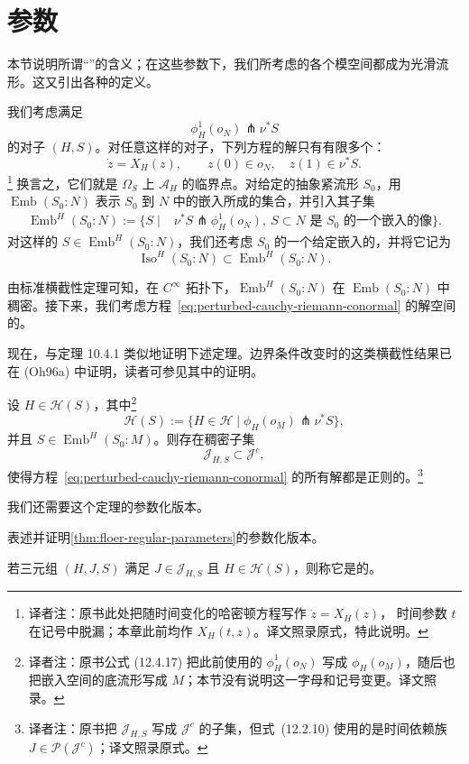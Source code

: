 \section{\termFloerRegular{}参数}
\label{sec:floer-regular-parameters}

本节说明所谓“\termGenericParameter{}”的含义；在这些参数下，我们所考虑的各个模空间都成为光滑流形。这又引出各种\termFloerOperator{}的定义。

我们考虑满足
\[
  \phi_H^1(o_N)\pitchfork\nu^*S
\]
的对子 $(H,S)$。对任意这样的对子，下列方程的解只有有限多个：
\[
  \dot z=X_H(z),
  \qquad z(0)\in o_N,
  \quad z(1)\in\nu^*S.
\]
\footnote{译者注：原书此处把随时间变化的哈密顿方程写作 $\dot z=X_H(z)$，
时间参数 $t$ 在记号中脱漏；本章此前均作 $X_H(t,z)$。译文照录原式，特此说明。}
换言之，它们就是 $\Omega_S$ 上 $\mathcal A_H$ 的临界点。对给定的抽象紧流形 $S_0$，用 $\operatorname{Emb}(S_0:N)$ 表示 $S_0$ 到 $N$ 中的嵌入所成的集合，并引入其子集
\begin{equation}
\begin{split}
  \operatorname{Emb}^{H}(S_0:N)
  :=\{S\mid {}&\nu^*S\pitchfork\phi_H^1(o_N),\ %
  S\subset N\text{ 是 }S_0\text{ 的一个嵌入的像}\}.
\end{split}
\label{eq:transverse-embedding-space}
\end{equation}
对这样的 $S\in\operatorname{Emb}^{H}(S_0:N)$，我们还考虑 $S_0$ 的一个给定嵌入的\termIsotopyClass{}，并将它记为
\[
  \operatorname{Iso}^{H}(S_0:N)
  \subset\operatorname{Emb}^{H}(S_0:N).
\]

由标准横截性定理可知，在 $C^\infty$ 拓扑下，$\operatorname{Emb}^{H}(S_0:N)$ 在 $\operatorname{Emb}(S_0:N)$ 中稠密。接下来，我们考虑方程~\eqref{eq:perturbed-cauchy-riemann-conormal} 的解空间的\termFredholmRegularity{}。

现在，与定理 10.4.1 类似地证明下述定理。边界条件改变时的这类横截性结果已在 (Oh96a) 中证明，读者可参见其中的证明。

\begin{theorem}
\label{thm:floer-regular-parameters}
设 $H\in\mathcal H(S)$，其中\footnote{译者注：原书公式 (12.4.17) 把此前使用的 $\phi_H^1(o_N)$ 写成 $\phi_H(o_M)$，随后也把嵌入空间的底流形写成 $M$；本节没有说明这一字母和记号变更。译文照录。}
\begin{equation}
  \mathcal H(S)
  :=\{H\in\mathcal H\mid\phi_H(o_M)\pitchfork\nu^*S\},
  \label{eq:regular-hamiltonians-for-submanifold}
\end{equation}
并且 $S\in\operatorname{Emb}^{H}(S_0:M)$。则存在稠密子集
\[
  \mathcal J_{H,S}\subset\mathcal J^c,
\]
使得方程~\eqref{eq:perturbed-cauchy-riemann-conormal} 的所有解都是正则的。\footnote{译者注：原书把 $\mathcal J_{H,S}$ 写成 $\mathcal J^c$ 的子集，但式~(12.2.10) 使用的是时间依赖族 $J\in\mathcal P(\mathcal J^c)$；译文照录原式。}
\end{theorem}

我们还需要这个定理的参数化版本。

\begin{exercise}
\label{ex:parametrized-floer-regularity}
表述并证明\cref{thm:floer-regular-parameters}的参数化版本。
\end{exercise}

若三元组 $(H,J,S)$ 满足 $J\in\mathcal J_{H,S}$ 且 $H\in\mathcal H(S)$，则称它是\emph{\termFloerRegular{}}的。
